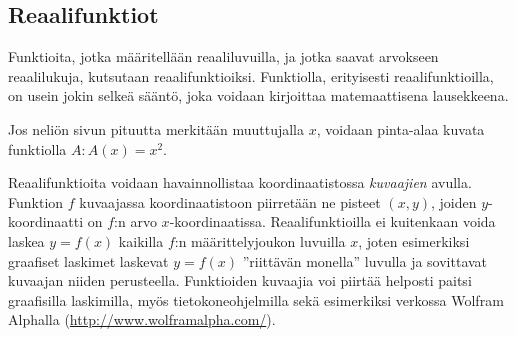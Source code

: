 \subsection*{Reaalifunktiot}

Funktioita, jotka määritellään reaaliluvuilla, ja jotka saavat arvokseen reaalilukuja, kutsutaan reaalifunktioiksi.
Funktiolla, erityisesti reaalifunktioilla, on usein jokin selkeä sääntö, joka voidaan kirjoittaa matemaattisena lausekkeena.

\begin{esimerkki}
	Jos neliön sivun pituutta merkitään muuttujalla $x$, voidaan pinta-alaa kuvata funktiolla $A\colon A(x) = x^2$.
\end{esimerkki} 

Reaalifunktioita voidaan havainnollistaa koordinaatistossa \textit{kuvaajien} avulla.
Funktion $f$ kuvaajassa koordinaatistoon piirretään ne pisteet $(x, y)$, joiden $y$-koordinaatti on $f$:n arvo $x$-koordinaatissa.
Reaalifunktioilla ei kuitenkaan voida laskea $y = f(x)$ kaikilla $f$:n määrittelyjoukon luvuilla $x$, joten esimerkiksi graafiset laskimet
laskevat $y = f(x)$ ''riittävän monella'' luvulla ja sovittavat kuvaajan niiden perusteella.
Funktioiden kuvaajia voi piirtää helposti paitsi graafisilla laskimilla, myös tietokoneohjelmilla sekä esimerkiksi verkossa
Wolfram Alphalla (\url{http://www.wolframalpha.com/}). 

\def\vcent#1{\mathsurround0pt$\vcenter{\hbox{#1}}$}


